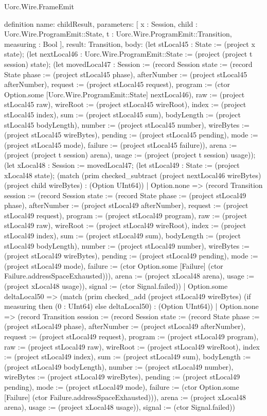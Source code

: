 \begin{lexlean}{Uorc.Wire.FrameEmit}
\begin{semanticmodule}
definition{
  name: childResult,
  parameters: [
    x : Session,
    child : Uorc.Wire.ProgramEmit::State,
    t : Uorc.Wire.ProgramEmit::Transition,
    measuring : Bool
  ],
  result: Transition,
  body: (let stLocal45 : State := (project x state); (let nextLocal46 : Uorc.Wire.ProgramEmit::State := (project (project t session) state); (let movedLocal47 : Session := (record Session {state := (record State {phase := (project stLocal45 phase), afterNumber := (project stLocal45 afterNumber), request := (project stLocal45 request), program := (ctor Option.some [Uorc.Wire.ProgramEmit::State] nextLocal46), raw := (project stLocal45 raw), wireRoot := (project stLocal45 wireRoot), index := (project stLocal45 index), sum := (project stLocal45 sum), bodyLength := (project stLocal45 bodyLength), number := (project stLocal45 number), wireBytes := (project stLocal45 wireBytes), pending := (project stLocal45 pending), mode := (project stLocal45 mode), failure := (project stLocal45 failure)}), arena := (project (project t session) arena), usage := (project (project t session) usage)}); (let xLocal48 : Session := movedLocal47; (let stLocal49 : State := (project xLocal48 state); (match (prim checked_subtract (project nextLocal46 wireBytes) (project child wireBytes) : (Option UInt64))
    | Option.none => (record Transition {session := (record Session {state := (record State {phase := (project stLocal49 phase), afterNumber := (project stLocal49 afterNumber), request := (project stLocal49 request), program := (project stLocal49 program), raw := (project stLocal49 raw), wireRoot := (project stLocal49 wireRoot), index := (project stLocal49 index), sum := (project stLocal49 sum), bodyLength := (project stLocal49 bodyLength), number := (project stLocal49 number), wireBytes := (project stLocal49 wireBytes), pending := (project stLocal49 pending), mode := (project stLocal49 mode), failure := (ctor Option.some [Failure] (ctor Failure.addressSpaceExhausted))}), arena := (project xLocal48 arena), usage := (project xLocal48 usage)}), signal := (ctor Signal.failed)})
    | Option.some deltaLocal50 => (match (prim checked_add (project stLocal49 wireBytes) (if measuring then (0 : UInt64) else deltaLocal50) : (Option UInt64))
      | Option.none => (record Transition {session := (record Session {state := (record State {phase := (project stLocal49 phase), afterNumber := (project stLocal49 afterNumber), request := (project stLocal49 request), program := (project stLocal49 program), raw := (project stLocal49 raw), wireRoot := (project stLocal49 wireRoot), index := (project stLocal49 index), sum := (project stLocal49 sum), bodyLength := (project stLocal49 bodyLength), number := (project stLocal49 number), wireBytes := (project stLocal49 wireBytes), pending := (project stLocal49 pending), mode := (project stLocal49 mode), failure := (ctor Option.some [Failure] (ctor Failure.addressSpaceExhausted))}), arena := (project xLocal48 arena), usage := (project xLocal48 usage)}), signal := (ctor Signal.failed)})
}
\end{semanticmodule}
\end{lexlean}

